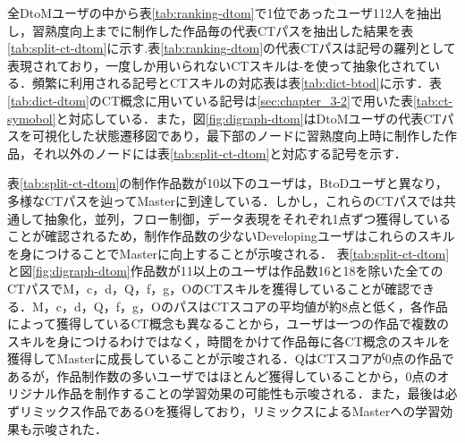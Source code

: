 \documentclass[submit,ses,noauthor]{ipsj}
\begin{document}
全DtoMユーザの中から表\ref{tab:ranking-dtom}で1位であったユーザ112人を抽出し，習熟度向上までに制作した作品毎の代表CTパスを抽出した結果を表\ref{tab:split-ct-dtom}に示す.表\ref{tab:ranking-dtom}の代表CTパスは記号の羅列として表現されており，一度しか用いられないCTスキルは-を使って抽象化されている．頻繁に利用される記号とCTスキルの対応表は表\ref{tab:dict-btod}に示す．表\ref{tab:dict-dtom}のCT概念に用いている記号は\ref{sec:chapter_3-2}で用いた表\ref{tab:ct-symobol}と対応している．また，図\ref{fig:digraph-dtom}はDtoMユーザの代表CTパスを可視化した状態遷移図であり，最下部のノードに習熟度向上時に制作した作品，それ以外のノードには表\ref{tab:split-ct-dtom}と対応する記号を示す．

表\ref{tab:split-ct-dtom}の制作作品数が10以下のユーザは，BtoDユーザと異なり，多様なCTパスを辿ってMasterに到達している．しかし，これらのCTパスでは共通して抽象化，並列，フロー制御，データ表現をそれぞれ1点ずつ獲得していることが確認されるため，制作作品数の少ないDevelopingユーザはこれらのスキルを身につけることでMasterに向上することが示唆される．
表\ref{tab:split-ct-dtom}と図\ref{fig:digraph-dtom}作品数が11以上のユーザは作品数16と18を除いた全てのCTパスでM，c，d，Q，f，g，OのCTスキルを獲得していることが確認できる．M，c，d，Q，f，g，OのパスはCTスコアの平均値が約8点と低く，各作品によって獲得しているCT概念も異なることから，ユーザは一つの作品で複数のスキルを身につけるわけではなく，時間をかけて作品毎に各CT概念のスキルを獲得してMasterに成長していることが示唆される．QはCTスコアが0点の作品であるが，作品制作数の多いユーザではほとんど獲得していることから，0点のオリジナル作品を制作することの学習効果の可能性も示唆される．また，最後は必ずリミックス作品であるOを獲得しており，リミックスによるMasterへの学習効果も示唆された．
\end{document}
